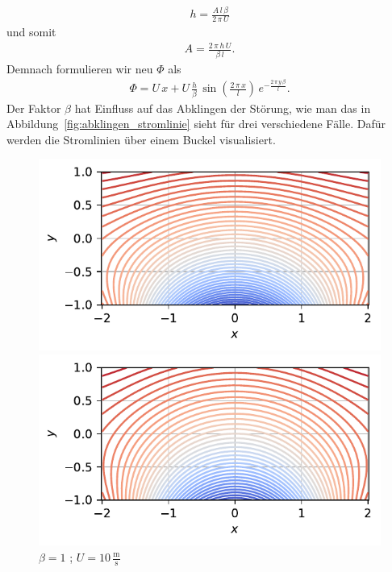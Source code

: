 \begin{align*}
    h
    =
    \frac{A\,l\,\beta}{2\,\pi\,U}
\end{align*}
und somit 
\begin{align*}
    A
    =
    \frac{2\,\pi\,h\,U}{\beta\,l}.
\end{align*}
Demnach formulieren wir neu $\Phi$ als
\begin{align*}
    \Phi
    =
    U\,x + U\,\frac{h}{\beta}\,\sin\left(\frac{2\,\pi\,x}{l}\right)
    \,e^{-\frac{2\,\pi\,y\,\beta}{l}}.
\end{align*}
Der Faktor $\beta$ hat Einfluss auf das Abklingen der Störung,
wie man das in Abbildung~\ref{fig:abklingen_stromlinie} sieht für 
drei verschiedene Fälle.
Dafür werden die Stromlinien über einem Buckel visualisiert.
\begin{figure}
    \centering
    \begin{minipage}[b]{0.32\textwidth}
        \centering
        \includegraphics[width=\linewidth]{papers/ueberschall/figures/abklingen_10.pdf}
        \caption*{$\beta = 1$ ; $U = 10\,\frac{\mathrm{m}}{\mathrm{s}}$}
    \end{minipage}
    \hfill
    \begin{minipage}[b]{0.32\textwidth}
        \centering
        \includegraphics[width=\linewidth]{papers/ueberschall/figures/abklingen_200.pdf}

\end{minipage}
\end{figure}
